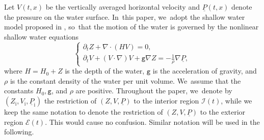 \documentclass[11pt]{article}
\newcommand{\gr}{{\mathtt g}}
\newcommand{\dt}{\partial_t}
\newcommand{\cI}{{\mathcal I}}
\newcommand{\cE}{{\mathcal E}}
\newcommand{\ul}[1]{\underline{#1}}
\theoremstyle{definition}
\begin{document}
Let $V(t,x)$ be the vertically averaged horizontal velocity and $\ul{P}(t,x)$ denote the pressure on the water surface. In~this paper, we~adopt the shallow water model proposed in \cite{Lannes2017}, so~that the motion of the water is governed by the nonlinear shallow water equations
\begin{equation}\label{NLSWE}
\begin{cases}
\dt Z+\nabla\cdot(HV) = 0, \\
\dt V+(V\cdot\nabla)V+\gr\nabla Z = -\frac{1}{\rho}\nabla\ul{P},
\end{cases}
\end{equation}
where $H=H_0+Z$ is the depth of the water, $\gr$ is the acceleration of gravity, and $\rho$ is the constant density of the water per unit volume. We~assume that the constants $H_0, \gr$, and $\rho$ are positive.
Throughout the paper, we~denote by $(Z_\mathrm{i},V_\mathrm{i},\ul{P}_\mathrm{i})$ the restriction of $(Z,V,\ul{P})$ to the interior region $\cI(t)$,
while we keep the same notation to denote the restriction of $(Z,V,\ul{P})$ to the exterior region $\cE(t)$.
This would cause no confusion.
Similar notation will be used in the following.
\end{document}
